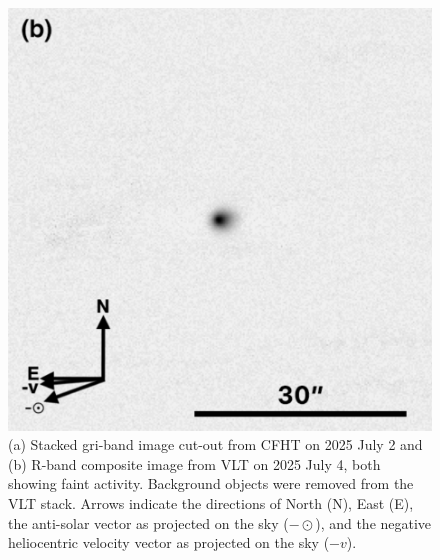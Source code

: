 \documentclass[twocolumn,longbib]{aastex7}
\begin{document}
\begin{CJK*}{UTF8}{gbsn}
\begin{figure}
    \includegraphics[width=1.\linewidth]{static/3I_VLT_Jul4_annotated.pdf}
\caption{(a) Stacked gri-band image cut-out from CFHT on 2025 July 2 and (b) R-band composite image from VLT on 2025 July 4, both showing faint activity. Background objects were removed from the VLT stack.  Arrows indicate the directions of North (N), East (E), the anti-solar vector as projected on the sky ($-\odot$), and the negative heliocentric velocity vector as projected on the sky ($-v$).
}
\label{fig:cfht_vlt}
\end{figure}


\end{CJK*}
\end{document}
